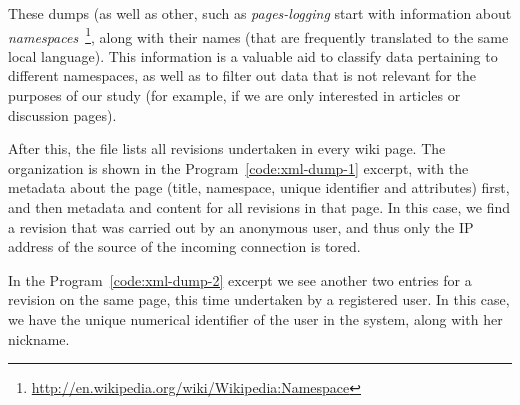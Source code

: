 These dumps (as well as other, such as \textit{pages-logging} start with information about 
\textit{namespaces}~\footnote{\url{http://en.wikipedia.org/wiki/Wikipedia:Namespace}}, along
with their names (that are frequently translated to the same local language). This
information is a valuable aid to classify data pertaining to different namespaces,
as well as to filter out data that is not relevant for the purposes of our study
(for example, if we are only interested in articles or discussion pages).

After this, the file lists all revisions undertaken in every wiki page. The organization
is shown in the Program~\ref{code:xml-dump-1} excerpt, with the metadata about
the page (title, namespace, unique identifier and attributes) first, and then
metadata and content for all revisions in that page. In this case, we find a
revision that was carried out by an anonymous user, and thus only the IP address
of the source of the incoming connection is tored.

In the Program~\ref{code:xml-dump-2} excerpt we see another two entries 
for a revision on the same page, this time undertaken by a registered user. 
In this case, we have the unique numerical identifier of the user in the 
system, along with her nickname.

